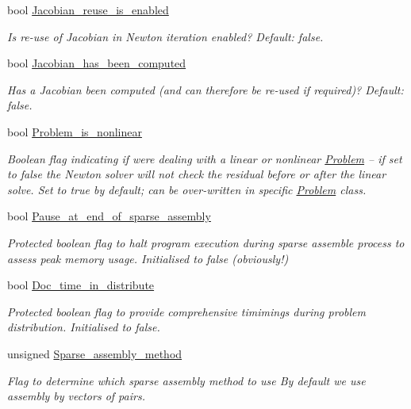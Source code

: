 \begin{DoxyCompactItemize}
bool \hyperlink{classoomph_1_1Problem_a022796f2c96f2dff6ed1db2338c93aaf}{Jacobian\+\_\+reuse\+\_\+is\+\_\+enabled}
\begin{DoxyCompactList}\small\item\em Is re-\/use of Jacobian in Newton iteration enabled? Default\+: false. \end{DoxyCompactList}\item 
bool \hyperlink{classoomph_1_1Problem_a2c4702c75739c967ed582dbd0a7ba56f}{Jacobian\+\_\+has\+\_\+been\+\_\+computed}
\begin{DoxyCompactList}\small\item\em Has a Jacobian been computed (and can therefore be re-\/used if required)? Default\+: false. \end{DoxyCompactList}\item 
bool \hyperlink{classoomph_1_1Problem_ade2d3efba34f69aafaefc076ddb3b8d4}{Problem\+\_\+is\+\_\+nonlinear}
\begin{DoxyCompactList}\small\item\em Boolean flag indicating if we\textquotesingle{}re dealing with a linear or nonlinear \hyperlink{classoomph_1_1Problem}{Problem} -- if set to false the Newton solver will not check the residual before or after the linear solve. Set to true by default; can be over-\/written in specific \hyperlink{classoomph_1_1Problem}{Problem} class. \end{DoxyCompactList}\item 
bool \hyperlink{classoomph_1_1Problem_aedefa8337ace6043c2fdfd5a2d19afd3}{Pause\+\_\+at\+\_\+end\+\_\+of\+\_\+sparse\+\_\+assembly}
\begin{DoxyCompactList}\small\item\em Protected boolean flag to halt program execution during sparse assemble process to assess peak memory usage. Initialised to false (obviously!) \end{DoxyCompactList}\item 
bool \hyperlink{classoomph_1_1Problem_a524b68efcaae084ad7144f944cb39c69}{Doc\+\_\+time\+\_\+in\+\_\+distribute}
\begin{DoxyCompactList}\small\item\em Protected boolean flag to provide comprehensive timimings during problem distribution. Initialised to false. \end{DoxyCompactList}\item 
unsigned \hyperlink{classoomph_1_1Problem_a447f9d42b248f6c394581ff1a0b02513}{Sparse\+\_\+assembly\+\_\+method}
\begin{DoxyCompactList}\small\item\em Flag to determine which sparse assembly method to use By default we use assembly by vectors of pairs. \end{DoxyCompactList}\item 

\end{DoxyCompactItemize}
